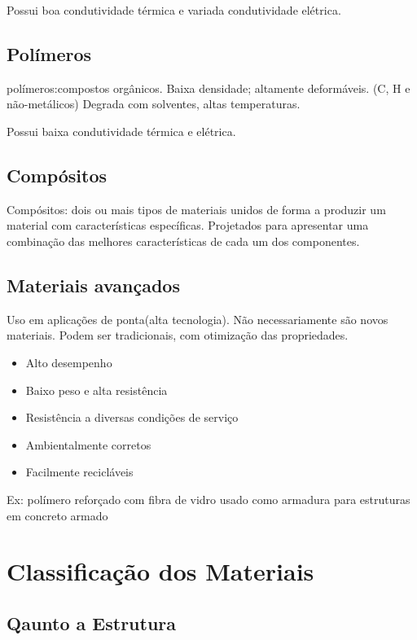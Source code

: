 Possui boa condutividade térmica e variada condutividade elétrica.

\subsection*{Polímeros}


polímeros:compostos orgânicos. Baixa densidade; altamente deformáveis. (C, H e não-metálicos)
Degrada com solventes, altas temperaturas.

Possui baixa condutividade térmica e elétrica.

\subsection*{Compósitos}

Compósitos: dois ou mais tipos de materiais unidos de forma a produzir um material com características específicas. Projetados para apresentar uma combinação das melhores características de cada um dos componentes.

\subsection*{Materiais avançados}

Uso em aplicações de ponta(alta tecnologia). Não necessariamente são novos materiais. Podem ser tradicionais, com otimização das propriedades.

\begin{itemize}
		
	\setlength{\parskip}{0pt}
	\setlength{\itemsep}{0pt plus 1pt}
	
\item Alto desempenho
\item Baixo peso e alta resistência
\item Resistência a diversas condições de serviço
\item Ambientalmente corretos
\item Facilmente recicláveis
\end{itemize}
Ex: polímero reforçado com fibra de vidro usado como armadura para estruturas em concreto armado


\section{Classificação dos Materiais}

\subsection*{Qaunto a Estrutura}

